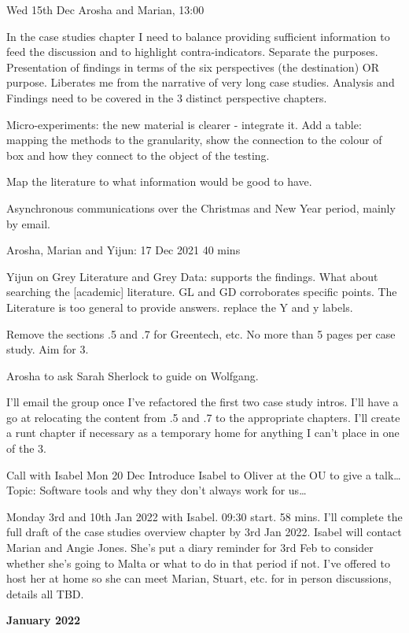 Wed 15th Dec
Arosha and Marian, 13:00

In the case studies chapter I need to balance providing sufficient information to feed the discussion and to highlight contra-indicators. Separate the purposes. Presentation of findings in terms of the six perspectives (the destination) OR purpose. Liberates me from the narrative of very long case studies.  Analysis and Findings need to be covered in the 3 distinct perspective chapters. 

Micro-experiments: the new material is clearer - integrate it. Add a table: mapping the methods to the granularity, show the connection to the colour of box and how they connect to the object of the testing.

Map the literature to what information would be good to have. 

Asynchronous communications over the Christmas and New Year period, mainly by email.

Arosha, Marian and Yijun: 17 Dec 2021 40 mins

Yijun on Grey Literature and Grey Data: supports the findings. What about searching the [academic] literature. GL and GD corroborates specific points. The Literature is too general to provide answers. 
replace the Y and y labels. 

Remove the sections .5 and .7 for Greentech, etc. No more than 5 pages per case study. Aim for 3.

Arosha to ask Sarah Sherlock to guide on Wolfgang.

I’ll email the group once I’ve refactored the first two case study intros. I’ll have a go at relocating the content from .5 and .7 to the appropriate chapters. I’ll create a runt chapter if necessary as a temporary home for anything I can’t place in one of the 3. 

Call with Isabel Mon 20 Dec
Introduce Isabel to Oliver at the OU to give a talk…
Topic: Software tools and why they don’t always work for us…

Monday 3rd and 10th Jan 2022 with Isabel. 09:30 start. 58 mins. I’ll complete the full draft of the case studies overview chapter by 3rd Jan 2022. Isabel will contact Marian and Angie Jones. She’s put a diary reminder for 3rd Feb to consider whether she’s going to Malta or what to do in that period if not. I’ve offered to host her at home so she can meet Marian, Stuart, etc. for in person discussions, details all TBD.

\textbf{January 2022} \dotfill

